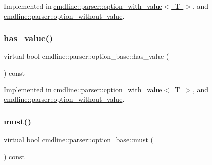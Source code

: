 Implemented in \mbox{\hyperlink{classcmdline_1_1parser_1_1option__with__value_aafe60a7f6f3e8a6928517382689e4867}{cmdline\+::parser\+::option\+\_\+with\+\_\+value$<$ T $>$}}, and \mbox{\hyperlink{classcmdline_1_1parser_1_1option__without__value_aa56f159aff4c9cd7bde01294077724e8}{cmdline\+::parser\+::option\+\_\+without\+\_\+value}}.

\mbox{\label{classcmdline_1_1parser_1_1option__base_a6617c8ff8b2864e8cf3182ca76f7e7ac}} 
\subsubsection{\texorpdfstring{has\_value()}{has\_value()}}
{\footnotesize\ttfamily virtual bool cmdline\+::parser\+::option\+\_\+base\+::has\+\_\+value (\begin{DoxyParamCaption}{ }\end{DoxyParamCaption}) const\hspace{0.3cm}{\ttfamily [pure virtual]}}



Implemented in \mbox{\hyperlink{classcmdline_1_1parser_1_1option__with__value_a4bf8da186590bb770ea1d29cff75ec19}{cmdline\+::parser\+::option\+\_\+with\+\_\+value$<$ T $>$}}, and \mbox{\hyperlink{classcmdline_1_1parser_1_1option__without__value_abf481f9d4f936c8ab27fed99a747164f}{cmdline\+::parser\+::option\+\_\+without\+\_\+value}}.

\mbox{\label{classcmdline_1_1parser_1_1option__base_aa12b58243643ca229983f5dcd5b0b82e}} 
\subsubsection{\texorpdfstring{must()}{must()}}
{\footnotesize\ttfamily virtual bool cmdline\+::parser\+::option\+\_\+base\+::must (\begin{DoxyParamCaption}{ }\end{DoxyParamCaption}) const\hspace{0.3cm}{\ttfamily [pure virtual]}}



